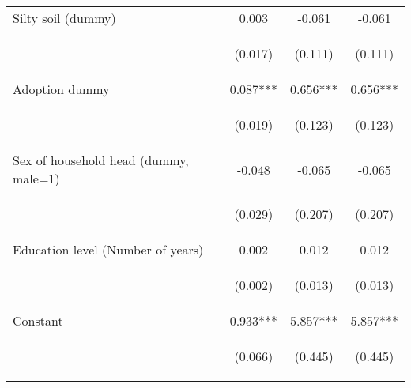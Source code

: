 \begin{center}
\begin{tabular}{lccc}
Silty soil (dummy) & 0.003 & -0.061 & -0.061 \\
\vspace{4pt} & \begin{footnotesize}(0.017)\end{footnotesize} & \begin{footnotesize}(0.111)\end{footnotesize} & \begin{footnotesize}(0.111)\end{footnotesize} \\
Adoption dummy & 0.087*** & 0.656*** & 0.656*** \\
\vspace{4pt} & \begin{footnotesize}(0.019)\end{footnotesize} & \begin{footnotesize}(0.123)\end{footnotesize} & \begin{footnotesize}(0.123)\end{footnotesize} \\
Sex of household head (dummy, male=1) & -0.048 & -0.065 & -0.065 \\
\vspace{4pt} & \begin{footnotesize}(0.029)\end{footnotesize} & \begin{footnotesize}(0.207)\end{footnotesize} & \begin{footnotesize}(0.207)\end{footnotesize} \\
Education level (Number of years) & 0.002 & 0.012 & 0.012 \\
\vspace{4pt} & \begin{footnotesize}(0.002)\end{footnotesize} & \begin{footnotesize}(0.013)\end{footnotesize} & \begin{footnotesize}(0.013)\end{footnotesize} \\
Constant & 0.933*** & 5.857*** & 5.857*** \\
 & \begin{footnotesize}(0.066)\end{footnotesize} & \begin{footnotesize}(0.445)\end{footnotesize} & \begin{footnotesize}(0.445)\end{footnotesize} \\

\end{tabular}
\end{center}
